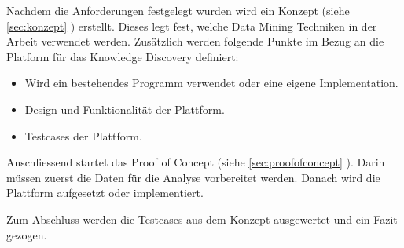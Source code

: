 Nachdem die Anforderungen festgelegt wurden wird ein Konzept (siehe \cref{sec:konzept} ) erstellt. Dieses legt fest, welche Data Mining Techniken in der Arbeit verwendet werden. Zusätzlich werden folgende Punkte im Bezug an die Platform für das Knowledge Discovery definiert:
\begin{itemize}
	\item Wird ein bestehendes Programm verwendet oder eine eigene Implementation.
	\item Design und Funktionalität der Plattform.
	\item Testcases der Plattform.
\end{itemize}

Anschliessend startet das Proof of Concept (siehe \cref{sec:proofofconcept} ). Darin müssen zuerst die Daten für die Analyse vorbereitet werden. Danach wird die Plattform aufgesetzt oder implementiert.

Zum Abschluss werden die Testcases aus dem Konzept ausgewertet und ein Fazit gezogen.

